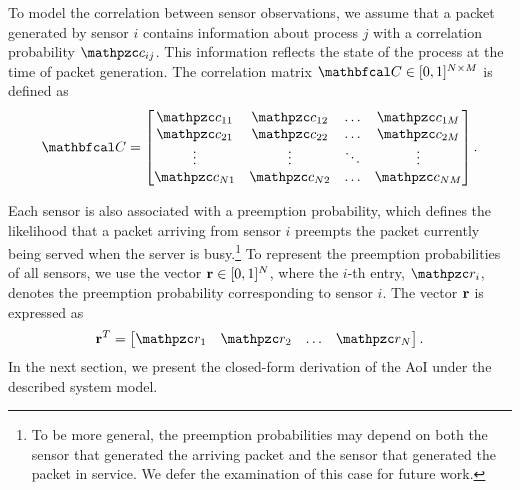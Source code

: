 To model the correlation between sensor observations, we assume that a packet generated by sensor \(i\) contains information about process \(j\) with a correlation probability \(\nc_{ij}\). This information reflects the state of the process at the time of packet generation. The correlation matrix \( \bfc \in [0,1]^{N \times M}\) is defined as
\begin{equation} 
\bfc = \begin{bmatrix}
\nc_{11} & \nc_{12} & \dots & \nc_{1M} \\
\nc_{21} & \nc_{22} & \dots & \nc_{2M} \\
\vdots & \vdots & \ddots & \vdots \\
\nc_{N1} & \nc_{N2} & \dots & \nc_{NM}
\end{bmatrix}.
\end{equation}

Each sensor is also associated with a preemption probability, which defines the likelihood that a packet arriving from sensor \(i\) preempts the packet currently being served when the server is busy.\footnote{To be more general, the preemption probabilities may depend on both the sensor that generated the arriving packet and the sensor that generated the packet in service. We defer the examination of this case for future work.} To represent the preemption probabilities of all sensors, we use the vector \(\mathbf{r} \in [0,1]^{N}\), where the \(i\)-th entry, \(\np_i\), denotes the preemption probability corresponding to sensor \(i\). The vector \(\mathbf{r}\) is expressed as
\begin{equation}
\bfp^T = \begin{bmatrix}
\np_{1} & \np_{2} & \dots & \np_{N} 
\end{bmatrix}.
\end{equation}
In the next section, we present the closed-form derivation of the AoI under the described system model.


